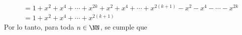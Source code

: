 \begin{examplebox}{}{}
\begin{align*}
        & = 1 + x^2 + x^4 + \cdots + x^{2k} + x^2 + x^4 + \cdots + x^{2(k+1)} - x^2 - x^4 - \cdots - x^{2k} \\
        & = 1 + x^2 + x^4 + \cdots + x^{2(k+1)}
    \end{align*}
    Por lo tanto, para toda $n \in \NN$, se cumple que
    \begin{matrizn}
    \end{matrizn}
\end{examplebox}

\newpage

